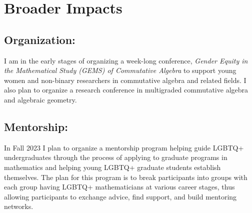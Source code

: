 \documentclass[11pt,reqno]{amsart}
\theoremstyle{remark}
\newcommand{\juliette}[1]{{\color{red} \sf $\spadesuit\spadesuit\spadesuit$ Juliette: [#1]}}
\begin{document}

\section{Broader Impacts}\label{sec:broader-impacts}

\subsection{Organization:} %
I am in the early stages of organizing a week-long conference, \textit{Gender Equity in the Mathematical Study (GEMS) of Commutative Algebra} to support young women and non-binary researchers in commutative algebra and related fields. I also plan to organize a research conference in multigraded commutative algebra and algebraic geometry.

\subsection{Mentorship:} In Fall 2023 I plan to organize a mentorship program helping guide LGBTQ+ undergraduates through the process of applying to graduate programs in mathematics and helping young LGBTQ+ graduate students establish themselves. The plan for this program is to break participants into groups with each group having LGBTQ+ mathematicians at various career stages, thus allowing participants to exchange advice, find support, and build mentoring networks. 
\end{document}
